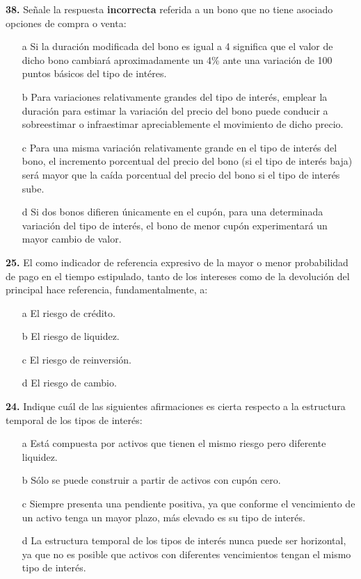 \documentclass{nuevotema}
\begin{document}
\textbf{38.}  Señale la respuesta \textbf{incorrecta} referida a un bono que no tiene asociado opciones de compra o venta:
\begin{enumerate}
	\item[a] Si la duración modificada del bono es igual a 4 significa que el valor de dicho bono cambiará aproximadamente un 4\% ante una variación de 100 puntos básicos del tipo de intéres.
	\item[b] Para variaciones relativamente grandes del tipo de interés, emplear la duración para estimar la variación del precio del bono puede conducir a sobreestimar o infraestimar apreciablemente el movimiento de dicho precio.
	\item[c] Para una misma variación relativamente grande en el tipo de interés del bono, el incremento porcentual del precio del bono (si el tipo de interés baja) será mayor que la caída porcentual del precio del bono si el tipo de interés sube.
	\item[d] Si dos bonos difieren únicamente en el cupón, para una determinada variación del tipo de interés, el bono de menor cupón experimentará un mayor cambio de valor.
\end{enumerate}

\textbf{25.} El  como indicador de referencia expresivo de la mayor o menor probabilidad de pago en el tiempo estipulado, tanto de los intereses como de la devolución del principal hace referencia, fundamentalmente, a:
\begin{enumerate}
	\item[a] El riesgo de crédito.
	\item[b] El riesgo de liquidez.
	\item[c] El riesgo de reinversión.
	\item[d] El riesgo de cambio.
\end{enumerate}

\textbf{24.} Indique cuál de las siguientes afirmaciones es cierta respecto a la estructura temporal de los tipos de interés:
\begin{enumerate}
	\item[a] Está compuesta por activos que tienen el mismo riesgo pero diferente liquidez.
	\item[b] Sólo se puede construir a partir de activos con cupón cero.
	\item[c] Siempre presenta una pendiente positiva, ya que conforme el vencimiento de un activo tenga un mayor plazo, más elevado es su tipo de interés.
	\item[d] La estructura temporal de los tipos de interés nunca puede ser horizontal, ya que no es posible que activos con diferentes vencimientos tengan el mismo tipo de interés.
\end{enumerate}
\end{document}
